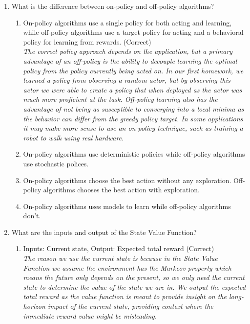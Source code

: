 \documentclass{exam}
\begin{document}
\begin{enumerate}
    \item What is the difference between on-policy and off-policy algorithms?         
        \begin{enumerate}
            \item On-policy algorithms use a single policy for both acting and learning, while off-policy algorithms use a target policy for acting and a behavioral policy for learning from rewards. (Correct)\\
                \textit{The correct policy approach depends on the application, but a primary advantage of an off-policy is the ability to decouple learning the optimal policy from the policy currently being acted on. In our first homework, we learned a policy from observing a random actor, but by observing this actor we were able to create a policy that when deployed as the actor was much more proficient at the task. Off-policy learning also has the advantage of not being as susceptible to converging into a local minima as the behavior can differ from the greedy policy target. In some applications it may make more sense to use an on-policy technique, such as training a robot to walk using real hardware.}
            \item On-policy algorithms use deterministic policies while off-policy algorithms use stochastic polices.
            \item On-policy algorithms choose the best action without any exploration. Off-policy algorithms chooses the best action with exploration.
            \item On-policy algorithms uses models to learn while off-policy algorithms don't.
        \end{enumerate}
    \item What are the inputs and output of the State Value Function?
        \begin{enumerate}
            \item Inputs: Current state, Output: Expected total reward (Correct)\\
            \textit{The reason we use the current state is because in the State Value Function we assume
            the environment has the Markcov property which means the future only depends on the present, so we only need the current state to determine the value of the state we are in. We output the expected total reward as the value function is meant to provide insight on the long-horizon impact of the current state, providing context where the immediate reward value might be misleading.}

\end{enumerate}
\end{enumerate}
\end{document}
